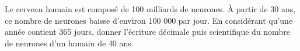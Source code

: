 
\begin{exercice}\label{exo2smath-0207}

Le cerveau humain est composé de 100 milliards de neurones. À partir de 30 ans, ce nombre de neurones baisse d'environ 100 000 par jour. En considérant qu'une année contient 365 jours, donner l'écriture décimale puis scientifique du nombre de neurones d'un humain de 40 ans.

\end{exercice}
